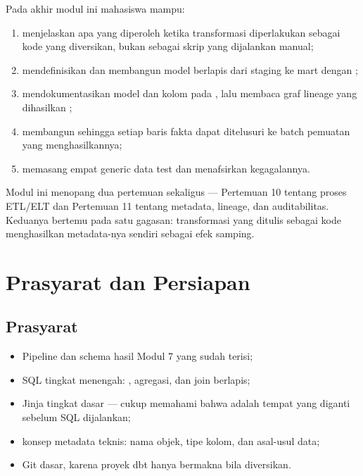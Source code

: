 \begin{capaian}
Pada akhir modul ini mahasiswa mampu:
\begin{enumerate}[leftmargin=1.4em]
  \item menjelaskan apa yang diperoleh ketika transformasi diperlakukan sebagai
        kode yang diversikan, bukan sebagai skrip yang dijalankan manual;
  \item mendefinisikan  dan membangun model berlapis dari
        staging ke mart dengan ;
  \item mendokumentasikan model dan kolom pada , lalu
        membaca graf lineage yang dihasilkan ;
  \item membangun  sehingga setiap baris fakta dapat
        ditelusuri ke batch pemuatan yang menghasilkannya;
  \item memasang empat generic data test dan menafsirkan kegagalannya.
\end{enumerate}
\end{capaian}

Modul ini menopang dua pertemuan sekaligus --- Pertemuan 10 tentang proses
ETL/ELT dan Pertemuan 11 tentang metadata, lineage, dan auditabilitas.
Keduanya bertemu pada satu gagasan: transformasi yang ditulis sebagai kode
menghasilkan metadata-nya sendiri sebagai efek samping.

\section{Prasyarat dan Persiapan}

\subsection{Prasyarat}

\begin{itemize}
  \item Pipeline dan schema  hasil Modul 7 yang sudah terisi;
  \item SQL tingkat menengah: , agregasi, dan join berlapis;
  \item Jinja tingkat dasar --- cukup memahami bahwa 
        adalah tempat yang diganti sebelum SQL dijalankan;
  \item konsep metadata teknis: nama objek, tipe kolom, dan asal-usul data;
  \item Git dasar, karena proyek dbt hanya bermakna bila diversikan.
\end{itemize}

